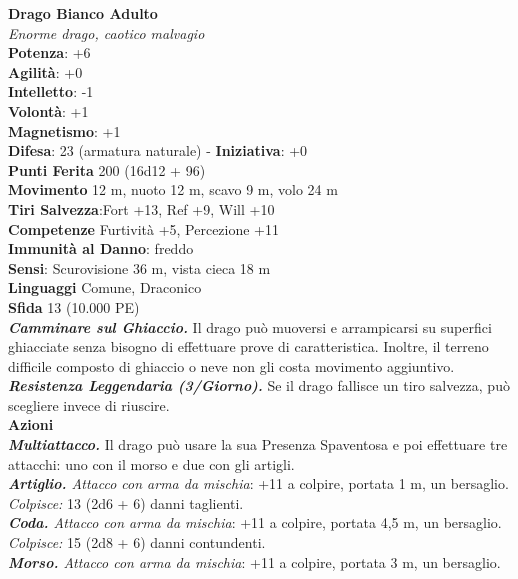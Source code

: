 \begin{multicols}{2}
\medskip\textbf{Drago Bianco Adulto}\\
\emph{Enorme drago, caotico malvagio}\\
\textbf{Potenza}: +6\\
\textbf{Agilità}: +0\\
\textbf{Intelletto}: -1\\
\textbf{Volontà}: +1\\
\textbf{Magnetismo}: +1\\
\textbf{Difesa}: 23 (armatura naturale) - \textbf{Iniziativa}: +0\\
\textbf{Punti Ferita} 200 (16d12 + 96)\\
\textbf{Movimento} 12 m, nuoto 12 m, scavo 9 m, volo 24 m\\
\textbf{Tiri Salvezza}:Fort +13, Ref +9, Will +10\\
\textbf{Competenze} Furtività +5, Percezione +11\\
\textbf{Immunità al Danno}: freddo\\
\textbf{Sensi}: Scurovisione 36 m, vista cieca 18 m\\
\textbf{Linguaggi} Comune, Draconico\\
\textbf{Sfida} 13 (10.000 PE)\smallskip\\
\emph{\textbf{Camminare sul Ghiaccio.}} Il drago può muoversi e arrampicarsi su superfici ghiacciate senza bisogno di effettuare prove di caratteristica. Inoltre, il terreno difficile composto di ghiaccio o neve non gli costa movimento aggiuntivo.\\
\emph{\textbf{Resistenza Leggendaria (3/Giorno).}} Se il drago fallisce un tiro salvezza, può scegliere invece di riuscire.\\
\smallskip\textbf{Azioni}\\
\emph{\textbf{Multiattacco.}} Il drago può usare la sua Presenza Spaventosa e poi effettuare tre attacchi: uno con il morso e due con gli artigli.\\
\emph{\textbf{Artiglio.} Attacco con arma da mischia}: +11 a colpire, portata 1 m, un bersaglio.\\
\emph{Colpisce:} 13 (2d6 + 6) danni taglienti.\\
\emph{\textbf{Coda.} Attacco con arma da mischia}: +11 a colpire, portata 4,5 m, un bersaglio.\\
\emph{Colpisce:} 15 (2d8 + 6) danni contundenti.\\
\emph{\textbf{Morso.} Attacco con arma da mischia}: +11 a colpire, portata 3 m, un bersaglio.\\

\end{multicols}
